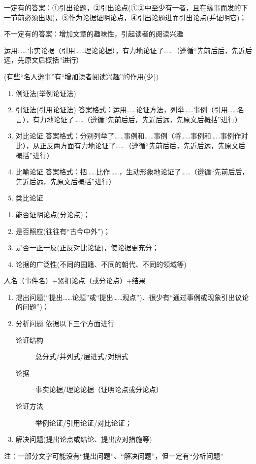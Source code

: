 一定有的答案：①引出论题，②引出论点(①②中至少有一者，且在缘事而发的下一节前必须出现)，③作为论据证明论点，④引出论题进而引出论点(并证明它)；

不一定有的答案：增加文章的趣味性，引起读者的阅读兴趣

运用\ldots{}\ldots{}事实论据（引用\ldots{}\ldots{}理论论据），有力地论证了\ldots{}\ldots{}（遵循``先前后后，先近后远，先原文后概括''进行）

(有些``名人逸事''有``增加读者阅读兴趣''的作用(少))

\begin{enumerate}
\item 例证法(举例论证法)
\item 引证法(引用论证法)
答案格式：运用\ldots{}\ldots{}论证方法，列举\ldots{}\ldots{}事例（引用\ldots{}\ldots{}名言），有力地论证了\ldots{}\ldots{}（遵循``先前后后，先近后远，先原文后概括''进行）
\item 对比论证
答案格式：分别列举了\ldots{}\ldots{}事例和\ldots{}\ldots{}事例（将\ldots{}\ldots{}事例和\ldots{}\ldots{}事例作对比），从正反两方面有力地论证了\ldots{}\ldots{}（遵循``先前后后，先近后远，先原文后概括''进行）
\item 比喻论证
答案格式：把\ldots{}\ldots{}比作\ldots{}\ldots{}，生动形象地论证了\ldots{}\ldots{}（遵循``先前后后，先近后远，先原文后概括''进行）
\item 类比论证
\end{enumerate}

\begin{enumerate}
\item 能否证明论点(分论点)；
\item 是否照应(往往有``古今中外'')；
\item 是否一正一反(正反对比论证)，使论据更充分；
\item 论据的广泛性(不同的国籍、不同的朝代、不同的领域等)
\end{enumerate}

人名（事件名）+紧扣论点（或分论点）+结果

\begin{enumerate}
\item 提出问题(``提出\ldots{}\ldots{}论题''或``提出\ldots{}\ldots{}观点'')、很少有``通过事例或现象引出议论的问题'')；
\item 分析问题
依据以下三个方面进行
\begin{description}
\item[论证结构]总分式/并列式/层进式/对照式
\item[论据]事实论据/理论论据（证明论点或分论点）
\item[论证方法]举例论证/引用论证/对比论证；
\end{description}
\item 解决问题(提出论点或结论、提出应对措施等)
\end{enumerate}
注：一部分文字可能没有``提出问题''、``解决问题''，但一定有``分析问题''


